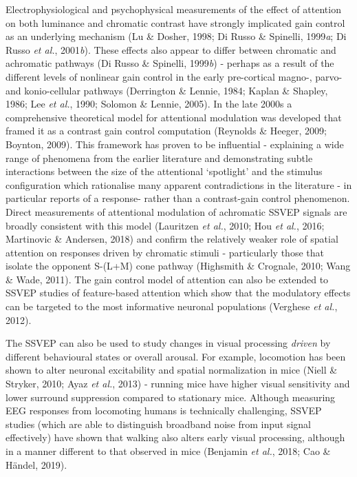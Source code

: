 \documentclass[
  letterpaper,
  DIV=11,
  numbers=noendperiod]{scrartcl}
\begin{document}
Electrophysiological and psychophysical measurements of the effect of
attention on both luminance and chromatic contrast have strongly
implicated gain control as an underlying mechanism (Lu \& Dosher, 1998;
Di Russo \& Spinelli, 1999\emph{a}; Di Russo \emph{et al.},
2001\emph{b}). These effects also appear to differ between chromatic and
achromatic pathways (Di Russo \& Spinelli, 1999\emph{b}) - perhaps as a
result of the different levels of nonlinear gain control in the early
pre-cortical magno-, parvo- and konio-cellular pathways (Derrington \&
Lennie, 1984; Kaplan \& Shapley, 1986; Lee \emph{et al.}, 1990; Solomon
\& Lennie, 2005). In the late 2000s a comprehensive theoretical model
for attentional modulation was developed that framed it as a contrast
gain control computation (Reynolds \& Heeger, 2009; Boynton, 2009). This
framework has proven to be influential - explaining a wide range of
phenomena from the earlier literature and demonstrating subtle
interactions between the size of the attentional `spotlight' and the
stimulus configuration which rationalise many apparent contradictions in
the literature - in particular reports of a response- rather than a
contrast-gain control phenomenon. Direct measurements of attentional
modulation of achromatic SSVEP signals are broadly consistent with this
model (Lauritzen \emph{et al.}, 2010; Hou \emph{et al.}, 2016;
Martinovic \& Andersen, 2018) and confirm the relatively weaker role of
spatial attention on responses driven by chromatic stimuli -
particularly those that isolate the opponent S-(L+M) cone pathway
(Highsmith \& Crognale, 2010; Wang \& Wade, 2011). The gain control
model of attention can also be extended to SSVEP studies of
feature-based attention which show that the modulatory effects can be
targeted to the most informative neuronal populations (Verghese \emph{et
al.}, 2012).

The SSVEP can also be used to study changes in visual processing
\textit{driven} by different behavioural states or overall arousal. For
example, locomotion has been shown to alter neuronal excitability and
spatial normalization in mice (Niell \& Stryker, 2010; Ayaz \emph{et
al.}, 2013) - running mice have higher visual sensitivity and lower
surround suppression compared to stationary mice. Although measuring EEG
responses from locomoting humans is technically challenging, SSVEP
studies (which are able to distinguish broadband noise from input signal
effectively) have shown that walking also alters early visual
processing, although in a manner different to that observed in mice
(Benjamin \emph{et al.}, 2018; Cao \& Händel, 2019).
\end{document}
